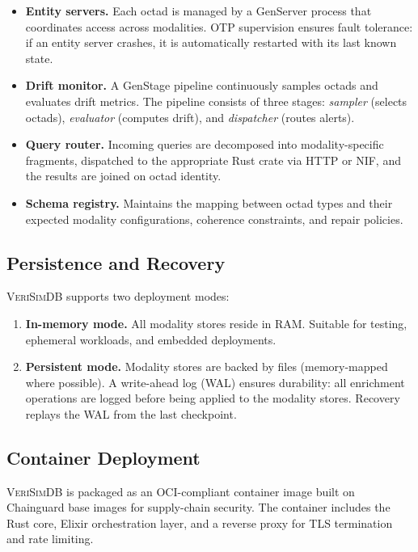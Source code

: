 \documentclass[11pt,twocolumn]{article}
\newcommand{\verisimdb}{\textsc{VeriSimDB}\xspace}
\begin{document}
\begin{itemize}[leftmargin=*]
  \item \textbf{Entity servers.}  Each octad is managed by a GenServer
    process that coordinates access across modalities.  OTP supervision
    ensures fault tolerance: if an entity server crashes, it is
    automatically restarted with its last known state.
  \item \textbf{Drift monitor.}  A GenStage pipeline continuously samples
    octads and evaluates drift metrics.  The pipeline consists of three
    stages: \emph{sampler} (selects octads), \emph{evaluator} (computes
    drift), and \emph{dispatcher} (routes alerts).
  \item \textbf{Query router.}  Incoming queries are decomposed into
    modality-specific fragments, dispatched to the appropriate Rust
    crate via HTTP or NIF, and the results are joined on octad identity.
  \item \textbf{Schema registry.}  Maintains the mapping between octad
    types and their expected modality configurations, coherence
    constraints, and repair policies.
\end{itemize}

\subsection{Persistence and Recovery}

\verisimdb supports two deployment modes:

\begin{enumerate}[leftmargin=*]
  \item \textbf{In-memory mode.}  All modality stores reside in RAM.
    Suitable for testing, ephemeral workloads, and embedded deployments.
  \item \textbf{Persistent mode.}  Modality stores are backed by files
    (memory-mapped where possible).  A write-ahead log (WAL) ensures
    durability: all enrichment operations are logged before being applied
    to the modality stores.  Recovery replays the WAL from the last
    checkpoint.
\end{enumerate}

\subsection{Container Deployment}

\verisimdb is packaged as an OCI-compliant container image built on
Chainguard base images for supply-chain security.  The container includes
the Rust core, Elixir orchestration layer, and a reverse proxy for TLS
termination and rate limiting.
\end{document}
